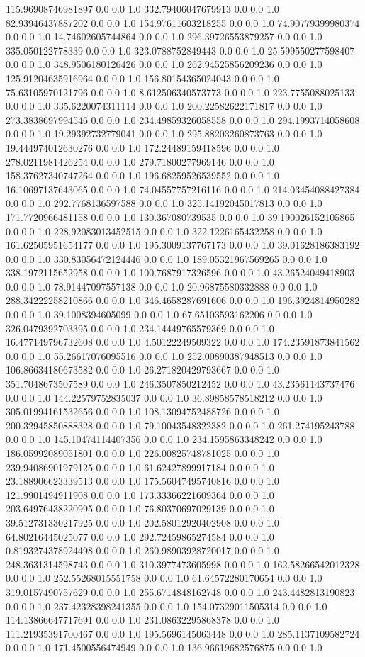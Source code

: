115.96908746981897	0.0	0.0	1.0
332.79406047679913	0.0	0.0	1.0
82.93946437887202	0.0	0.0	1.0
154.97611603218255	0.0	0.0	1.0
74.90779399980374	0.0	0.0	1.0
14.74602605744864	0.0	0.0	1.0
296.39726553879257	0.0	0.0	1.0
335.050122778339	0.0	0.0	1.0
323.0788752849443	0.0	0.0	1.0
25.599550277598407	0.0	0.0	1.0
348.9506180126426	0.0	0.0	1.0
262.94525856209236	0.0	0.0	1.0
125.91204635916964	0.0	0.0	1.0
156.80154365024043	0.0	0.0	1.0
75.63105970121796	0.0	0.0	1.0
8.612506340573773	0.0	0.0	1.0
223.7755088025133	0.0	0.0	1.0
335.6220074311114	0.0	0.0	1.0
200.22582622171817	0.0	0.0	1.0
273.3838697994546	0.0	0.0	1.0
234.49859326058558	0.0	0.0	1.0
294.1993714058608	0.0	0.0	1.0
19.29392732779041	0.0	0.0	1.0
295.88203260873763	0.0	0.0	1.0
19.444974012630276	0.0	0.0	1.0
172.24489159418596	0.0	0.0	1.0
278.0211981426254	0.0	0.0	1.0
279.71800277969146	0.0	0.0	1.0
158.37627340747264	0.0	0.0	1.0
196.68259526539552	0.0	0.0	1.0
16.10697137643065	0.0	0.0	1.0
74.04557757216116	0.0	0.0	1.0
214.03454088427384	0.0	0.0	1.0
292.7768136597588	0.0	0.0	1.0
325.14192045017813	0.0	0.0	1.0
171.7720966481158	0.0	0.0	1.0
130.367080739535	0.0	0.0	1.0
39.190026152105865	0.0	0.0	1.0
228.92083013452515	0.0	0.0	1.0
322.1226165432258	0.0	0.0	1.0
161.62505951654177	0.0	0.0	1.0
195.3009137767173	0.0	0.0	1.0
39.01628186383192	0.0	0.0	1.0
330.83056472124446	0.0	0.0	1.0
189.05321967569265	0.0	0.0	1.0
338.1972115652958	0.0	0.0	1.0
100.7687917326596	0.0	0.0	1.0
43.26524049418903	0.0	0.0	1.0
78.91447097557138	0.0	0.0	1.0
20.96875580332888	0.0	0.0	1.0
288.34222258210866	0.0	0.0	1.0
346.4658287691606	0.0	0.0	1.0
196.3924814950282	0.0	0.0	1.0
39.1008394605099	0.0	0.0	1.0
67.65103593162206	0.0	0.0	1.0
326.0479392703395	0.0	0.0	1.0
234.14449765579369	0.0	0.0	1.0
16.477149796732608	0.0	0.0	1.0
4.50122249509322	0.0	0.0	1.0
174.23591873841562	0.0	0.0	1.0
55.26617076095516	0.0	0.0	1.0
252.00890387948513	0.0	0.0	1.0
106.86634180673582	0.0	0.0	1.0
26.271820429793667	0.0	0.0	1.0
351.7048673507589	0.0	0.0	1.0
246.3507850212452	0.0	0.0	1.0
43.23561143737476	0.0	0.0	1.0
144.22579752835037	0.0	0.0	1.0
36.89858578518212	0.0	0.0	1.0
305.01994161532656	0.0	0.0	1.0
108.13094752488726	0.0	0.0	1.0
200.32945850888328	0.0	0.0	1.0
79.10043548322382	0.0	0.0	1.0
261.274195243788	0.0	0.0	1.0
145.10474114407356	0.0	0.0	1.0
234.1595863348242	0.0	0.0	1.0
186.05992089051801	0.0	0.0	1.0
226.00825748781025	0.0	0.0	1.0
239.94086901979125	0.0	0.0	1.0
61.62427899917184	0.0	0.0	1.0
23.188906623339513	0.0	0.0	1.0
175.56047495740816	0.0	0.0	1.0
121.9901494911908	0.0	0.0	1.0
173.33366221609364	0.0	0.0	1.0
203.64976438220995	0.0	0.0	1.0
76.80370697029139	0.0	0.0	1.0
39.512731330217925	0.0	0.0	1.0
202.58012920402908	0.0	0.0	1.0
64.80216445025077	0.0	0.0	1.0
292.72459865274584	0.0	0.0	1.0
0.8193274378924498	0.0	0.0	1.0
260.98903928720017	0.0	0.0	1.0
248.3631314598743	0.0	0.0	1.0
310.3977473605998	0.0	0.0	1.0
162.58266542012328	0.0	0.0	1.0
252.55268015551758	0.0	0.0	1.0
61.64572280170654	0.0	0.0	1.0
319.0157490757629	0.0	0.0	1.0
255.6714848162748	0.0	0.0	1.0
243.4482813190823	0.0	0.0	1.0
237.42328398241355	0.0	0.0	1.0
154.07329011505314	0.0	0.0	1.0
114.13866647717691	0.0	0.0	1.0
231.08632295868378	0.0	0.0	1.0
111.21935391700467	0.0	0.0	1.0
195.5696145063448	0.0	0.0	1.0
285.1137109582724	0.0	0.0	1.0
171.4500556474949	0.0	0.0	1.0
136.96619682576875	0.0	0.0	1.0
